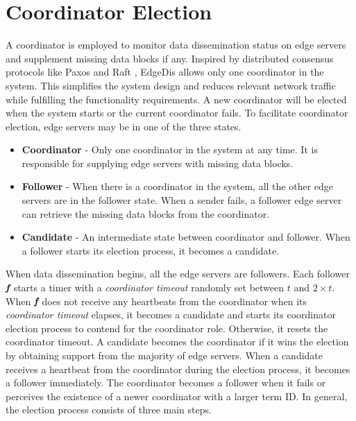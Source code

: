 \documentclass[10pt,journal,compsoc]{IEEEtran}
\def\mathbi#1{\textbf{\em #1}}
\begin{document}


%
\section{Coordinator Election}
\label{Sec:CoordinatorElection}
A coordinator is employed to monitor data dissemination status on edge servers and supplement missing data blocks if any. Inspired by distributed consensus protocols like Paxos \cite{lamport2001paxos} and Raft \cite{ongaro2014Raft}, EdgeDis allows only one coordinator in the system. This simplifies the system design and reduces relevant network traffic while fulfilling the functionality requirements. A new coordinator will be elected when the system starts or the current coordinator fails. To facilitate coordinator election, edge servers may be in one of the three states.  
\begin{itemize}
    \item \textbf{Coordinator} - Only one coordinator in the system at any time. It is responsible for supplying edge servers with missing data blocks.
    \item  \textbf{Follower} - When there is a coordinator in the system, all the other edge servers are in the follower state. When a sender fails, a follower edge server can retrieve the missing data blocks from the coordinator.
    \item  \textbf{Candidate} -  An intermediate state between coordinator and follower. When a follower starts its election process, it becomes a candidate.
\end{itemize}


When data dissemination begins, all the edge servers are followers. Each follower $\mathbi{f}$ starts a timer with a \textit{coordinator timeout} randomly set between $t$ and $2\times t$. When $\mathbi{f}$ does not receive any heartbeats from the coordinator when its \textit{coordinator timeout} elapses, it becomes a candidate and starts its coordinator election process to contend for the coordinator role. Otherwise, it resets the coordinator timeout. A candidate becomes the coordinator if it wins the election by obtaining support from the majority of edge servers. When a candidate receives a heartbeat from the coordinator during the election process, it becomes a follower immediately. The coordinator becomes a follower when it fails or perceives the existence of a newer coordinator with a larger term ID. In general, the election process consists of three main steps.
\end{document}
